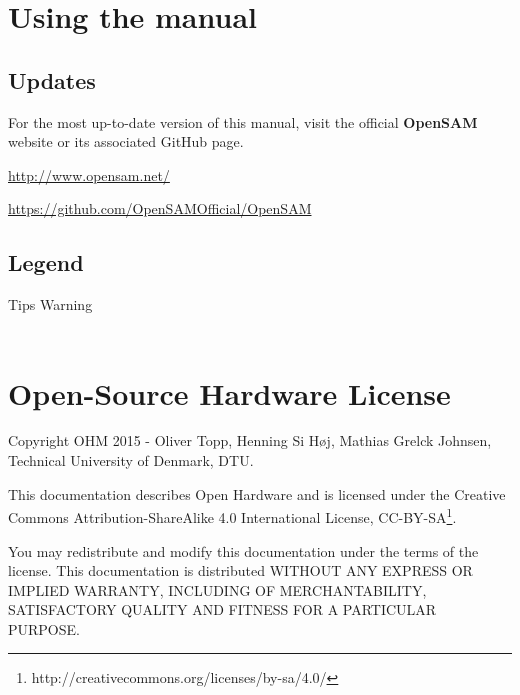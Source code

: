 \section{Using the manual}

\subsection{Updates}
For the most up-to-date version of this manual, visit the official \textbf{\textsf{OpenSAM}} website or its associated GitHub page.\par
\url{http://www.opensam.net/}\par
\url{https://github.com/OpenSAMOfficial/OpenSAM}

\subsection{Legend}

\begin{center}
\quad Tips \hspace{2cm} Warning\\[1em]
\Huge \Info \normalsize \hspace{2.5cm} \Huge \Radioactivity \normalsize\\
\end{center}

\section{Open-Source Hardware License}
Copyright OHM 2015 - Oliver Topp, Henning Si H\o j, Mathias Grelck Johnsen,\\
Technical University of Denmark, DTU.\par
This documentation describes Open Hardware and is licensed under the Creative Commons Attribution-ShareAlike 4.0 International License, CC-BY-SA\footnote{http://creativecommons.org/licenses/by-sa/4.0/}.\par
You may redistribute and modify this documentation under the terms of the
license. This documentation is distributed
WITHOUT ANY EXPRESS OR IMPLIED WARRANTY, INCLUDING OF
MERCHANTABILITY, SATISFACTORY QUALITY AND FITNESS FOR A
PARTICULAR PURPOSE.
\hfill\break

